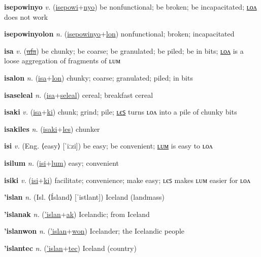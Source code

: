 \textbf{\hypertarget{isepowinyo}{isepowinyo}} \textit{v.} (\hyperlink{isepowi}{isepowi}+\allowbreak \hyperlink{nyo}{nyo})
be nonfunctional; be broken; be incapacitated; \hyperlink{isepowinyolon}{ʟᴏᴧ} does not work

\textbf{\hypertarget{isepowinyolon}{isepowinyolon}} \textit{n.} (\hyperlink{isepowinyo}{isepowinyo}+\allowbreak \hyperlink{lon}{lon})
nonfunctional; broken; incapacitated

\textbf{\hypertarget{isa}{isa}} \textit{v.} (\hyperlink{ufa}{\sout{ufa}})
be chunky; be coarse; be granulated; be piled; be in bits; \hyperlink{isalon}{ʟᴏᴧ} is a loose aggregation of fragments of ʟᴜᴍ

\textbf{\hypertarget{isalon}{isalon}} \textit{n.} (\hyperlink{isa}{isa}+\allowbreak \hyperlink{lon}{lon})
chunky; coarse; granulated; piled; in bits

\textbf{\hypertarget{isaseleal}{isaseleal}} \textit{n.} (\hyperlink{isa}{isa}+\allowbreak \hyperlink{seleal}{seleal})
cereal; breakfast cereal

\textbf{\hypertarget{isaki}{isaki}} \textit{v.} (\hyperlink{isa}{isa}+\allowbreak \hyperlink{ki}{ki})
chunk; grind; pile; \hyperlink{isakiles}{ʟєꜱ} turns ʟᴏᴧ into a pile of chunky bits

\textbf{\hypertarget{isakiles}{isakiles}} \textit{n.} (\hyperlink{isaki}{isaki}+\allowbreak \hyperlink{les}{les})
chunker

\textbf{\hypertarget{isi}{isi}} \textit{v.} (Eng. ⟨easy⟩ [ˈiːzi])
be easy; be convenient; \hyperlink{isilum}{ʟᴜᴍ} is easy to ʟᴏᴧ

\textbf{\hypertarget{isilum}{isilum}} \textit{n.} (\hyperlink{isi}{isi}+\allowbreak \hyperlink{lum}{lum})
easy; convenient

\textbf{\hypertarget{isiki}{isiki}} \textit{v.} (\hyperlink{isi}{isi}+\allowbreak \hyperlink{ki}{ki})
facilitate; convenience; make easy; ʟєꜱ makes ʟᴜᴍ easier for ʟᴏᴧ

\textbf{\hypertarget{'islan}{'islan}} \textit{n.} (Isl. ⟨Ísland⟩ [ˈistlant])
Iceland (landmass)

\textbf{\hypertarget{'islanak}{'islanak}} \textit{n.} (\hyperlink{'islan}{'islan}+\allowbreak \hyperlink{ak}{ak})
Icelandic; from Iceland

\textbf{\hypertarget{'islanwon}{'islanwon}} \textit{n.} (\hyperlink{'islan}{'islan}+\allowbreak \hyperlink{won}{won})
Icelander; the Icelandic people

\textbf{\hypertarget{'islantec}{'islantec}} \textit{n.} (\hyperlink{'islan}{'islan}+\allowbreak \hyperlink{tec}{tec})
Iceland (country)

